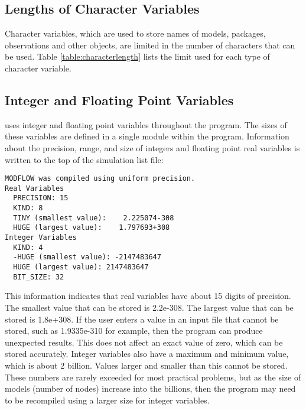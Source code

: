 \subsection{Lengths of Character Variables}
Character variables, which are used to store names of models, packages, observations and other objects, are limited in the number of characters that can be used. Table \ref{table:characterlength} lists the limit used for each type of character variable.

\FloatBarrier

\FloatBarrier

\subsection{Integer and Floating Point Variables}
\mf uses integer and floating point variables throughout the program.  The sizes of these variables are defined in a single module within the program.  Information about the precision, range, and size of integers and floating point real variables is written to the top of the simulation list file: 

{\small
\begin{lstlisting}[style=modeloutput]
MODFLOW was compiled using uniform precision.
Real Variables
  PRECISION: 15
  KIND: 8
  TINY (smallest value):    2.225074-308
  HUGE (largest value):    1.797693+308
Integer Variables
  KIND: 4
  -HUGE (smallest value): -2147483647
  HUGE (largest value): 2147483647
  BIT_SIZE: 32

\end{lstlisting}
}

This information indicates that real variables have about 15 digits of precision.  The smallest value that can be stored is 2.2e-308.  The largest value that can be stored is 1.8e+308.  If the user enters a value in an input file that cannot be stored, such as 1.9335e-310 for example, then the program can produce unexpected results.  This does not affect an exact value of zero, which can be stored accurately.  Integer variables also have a maximum and minimum value, which is about 2 billion.  Values larger and smaller than this cannot be stored.  These numbers are rarely exceeded for most practical problems, but as the size of models (number of nodes) increase into the billions, then the program may need to be recompiled using a larger size for integer variables.

